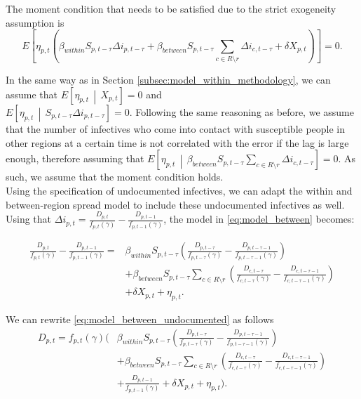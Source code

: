 \documentclass[12pt]{article}
\begin{document}
	The moment condition that needs to be satisfied due to the strict exogeneity assumption is
	    \[E\left[ \eta_{p,t} \left( \beta_{within} S_{p,t-\tau} \Delta i_{p,t-\tau}  + \beta_{between}S_{p,t-\tau} \sum_{c \in R \setminus r} \Delta i_{c, t-\tau} + \delta X_{p,t} \right) \right] = 0.\]
	    
	\noindent In the same way as in Section \ref{subsec:model_within_methodology}, we can assume that $E\left[\eta_{p,t} \,\middle|\, X_{p,t}\right] = 0$ and \\
	$E\left[\eta_{p,t} \,\middle|\, S_{p,t-\tau} \Delta i_{p,t-\tau}\right] = 0$. Following the same reasoning as before, we assume that the number of infectives who come into contact with susceptible people in other regions at a certain time is not correlated with the error if the lag is large enough, therefore assuming that $E\left[\eta_{p,t} \,\middle|\, \beta_{between}S_{p,t-\tau} \sum_{c \in R \setminus r} \Delta i_{c, t-\tau}\right] = 0$. As such, we assume that the moment condition holds. \\
	
	Using the specification of undocumented infectives, we can adapt the within and between-region spread model to include these undocumented infectives as well. Using that $\Delta i_{p,t} = \frac{D_{p,t}}{f_{p,t}(\gamma)} - \frac{D_{p,t-1}}{f_{p,t-1}(\gamma)}$, the model in \eqref{eq:model_between} becomes:
	
	    \begin{equation} \label{eq:model_between_undocumented}
            \begin{split}
        		\frac{D_{p,t}}{f_{p,t}(\gamma)} - \frac{D_{p,t-1}}{f_{p,t-1}(\gamma)} = &\beta_{within}S_{p,t-\tau}\left(\frac{D_{p,t-\tau}}{f_{p,t-\tau}(\gamma)} - \frac{D_{p,t-\tau-1}}{f_{p,t-\tau-1}(\gamma)}\right) \\
    		    &+ \beta_{between}S_{p,t-\tau} \sum_{c \in R \setminus r} \left(\frac{D_{c,t-\tau}}{f_{c,t-\tau}(\gamma)} - \frac{D_{c,t-\tau-1}}{f_{c,t-\tau-1}(\gamma)} \right) \\
    		    &+ \delta X_{p,t} + \eta_{p,t}.
    		\end{split}
        \end{equation}
	
	\noindent We can rewrite \eqref{eq:model_between_undocumented} as follows
	    \begin{align*}
	       D_{p,t} = f_{p,t}(\gamma)\Bigg(&\beta_{within}S_{p,t-\tau}\left(\frac{D_{p,t-\tau}}{f_{p,t-\tau}(\gamma)} - \frac{D_{p,t-\tau-1}}{f_{p,t-\tau-1}(\gamma)}\right) \\
	       &+ \beta_{between}S_{p,t-\tau} \sum_{c \in R \setminus r} \left(\frac{D_{c,t-\tau}}{f_{c,t-\tau}(\gamma)} - \frac{D_{c,t-\tau-1}}{f_{c,t-\tau-1}(\gamma)} \right) \\
	       & + \frac{D_{p,t-1}}{f_{p,t-1}(\gamma)} + \delta X_{p,t} + \eta_{p,t}\Bigg).
	    \end{align*}
	    
\end{document}
